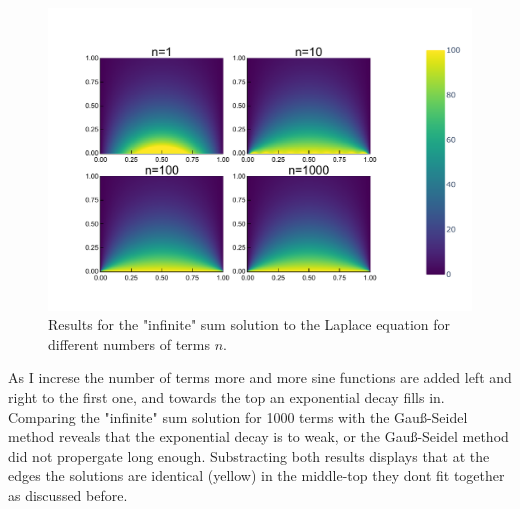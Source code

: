 \documentclass[
	a4paper, %
	10pt, %
]{CSUniSchoolLabReport}
\begin{document}
\begin{figure}[H]
	\centering
	\includegraphics[width=\textwidth]{../saves_t1/comp_lapplace_series_heatmap.pdf}
	\caption{Results for the "infinite" sum solution to the Laplace equation for different numbers of terms $n$.}
\end{figure}

As I increse the number of terms more and more sine functions are added left and right to the first one, and towards the top an exponential decay fills in. Comparing the "infinite" sum solution for 1000 terms with the Gauß-Seidel method reveals that the exponential decay is to weak, or the Gauß-Seidel method did not propergate long enough. Substracting both results displays that at the edges the solutions are identical (yellow) in the middle-top they dont fit together as discussed before.
\end{document}
